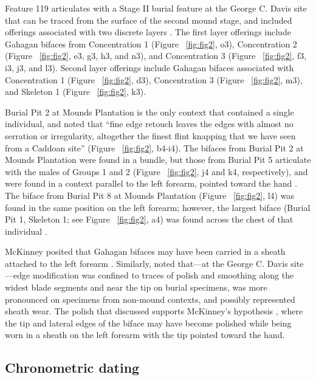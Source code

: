 \documentclass[review]{elsarticle}
\begin{document}
Feature 119 \citep[Figure 13-18]{RN808} articulates with a Stage II burial feature at the George C. Davis site that can be traced from the surface of the second mound stage, and included offerings associated with two discrete layers \citep{RN808,RN5050,RN806}. The first layer offerings include Gahagan bifaces from Concentration 1 (Figure ~\ref{fig:fig2}, o3), Concentration 2 (Figure ~\ref{fig:fig2}, e3, g3, h3, and n3), and Concentration 3 (Figure ~\ref{fig:fig2}, f3, i3, j3, and l3). Second layer offerings include Gahagan bifaces associated with Concentration 1 (Figure ~\ref{fig:fig2}, d3), Concentration 3 (Figure ~\ref{fig:fig2}, m3), and Skeleton 1 (Figure ~\ref{fig:fig2}, k3). 

Burial Pit 2 at Mounds Plantation is the only context that contained a single individual, and \citet[97]{RN11561} noted that “fine edge retouch leaves the edges with almost no serration or irregularity, altogether the finest flint knapping that we have seen from a Caddoan site” (Figure ~\ref{fig:fig2}, b4-i4). The bifaces from Burial Pit 2 at Mounds Plantation were found in a bundle, but those from Burial Pit 5 articulate with the males of Groups 1 and 2 (Figure ~\ref{fig:fig2}, j4 and k4, respectively), and were found in a context parallel to the left forearm, pointed toward the hand \citep[Figure 5]{RN11561}. The biface from Burial Pit 8 at Mounds Plantation (Figure ~\ref{fig:fig2}, l4) was found in the same position on the left forearm; however, the largest biface (Burial Pit 1, Skeleton 1; see Figure ~\ref{fig:fig2}, a4) was found across the chest of that individual \citep{RN11561}.

McKinney posited that Gahagan bifaces may have been carried in a sheath attached to the left forearm \citep{RN11561}. Similarly, \citet{RN3684} noted that---at the George C. Davis site---edge modification was confined to traces of polish and smoothing along the widest blade segments and near the tip on burial specimens, was more pronounced on specimens from non-mound contexts, and possibly represented sheath wear. The polish that \citet{RN3684} discussed supports McKinney’s hypothesis \citep{RN11561}, where the tip and lateral edges of the biface may have become polished while being worn in a sheath on the left forearm with the tip pointed toward the hand.

\subsection*{Chronometric dating}
\end{document}
